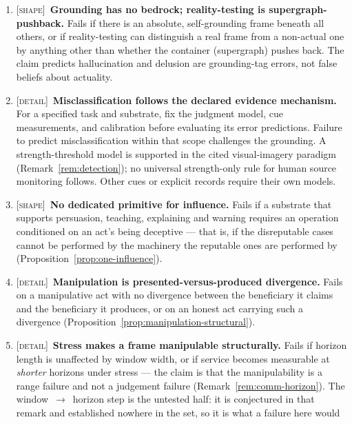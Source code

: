 \documentclass[11pt,a4paper]{article}
\theoremstyle{remark}\newtheorem{remark}[definition]{Remark}
\begin{document}
\begin{enumerate}[leftmargin=*]
frame is demonstrably non-actual (real graph data that runs yet is not real), or if
the imagined/perceived distinction requires an actuality property rather than
frame-relative grounding. The claim predicts imagination does real computational work
(planning, design) as real runs, not pretence.
\item \textsc{[shape]}~\textbf{Grounding has no bedrock; reality-testing is supergraph-pushback.} Fails
if there is an absolute, self-grounding frame beneath all others, or if reality-testing
can distinguish a real frame from a non-actual one by anything other than whether the
container (supergraph) pushes back. The claim predicts hallucination and delusion are
grounding-tag errors, not false beliefs about actuality.
\item \textsc{[detail]}~\textbf{Misclassification follows the declared evidence mechanism.}
For a specified task and substrate, fix the judgment model, cue measurements,
and calibration before evaluating its error predictions. Failure to predict
misclassification within that scope challenges the grounding. A strength-threshold
model is supported in the cited visual-imagery paradigm
(Remark~\ref{rem:detection}); no universal strength-only rule for human source
monitoring follows. Other cues or explicit records require their own models.
\item \textsc{[shape]}~\textbf{No dedicated primitive for influence.} Fails if a substrate that
supports persuasion, teaching, explaining and warning requires an operation conditioned on an act's
being deceptive --- that is, if the disreputable cases cannot be performed by the machinery the
reputable ones are performed by (Proposition~\ref{prop:one-influence}).
\item \textsc{[detail]}~\textbf{Manipulation is presented-versus-produced divergence.} Fails on a
manipulative act with no divergence between the beneficiary it claims and the beneficiary it
produces, or on an honest act carrying such a divergence
(Proposition~\ref{prop:manipulation-structural}).
\item \textsc{[detail]}~\textbf{Stress makes a frame manipulable structurally.} Fails if horizon
length is unaffected by window width, or if service becomes measurable at \emph{shorter} horizons
under stress --- the claim is that the manipulability is a range failure and not a judgement failure
(Remark~\ref{rem:comm-horizon}). The window~$\to$~horizon step is the untested half: it is
conjectured in that remark and established nowhere in the set, so it is what a failure here would

\end{enumerate}
\end{document}

